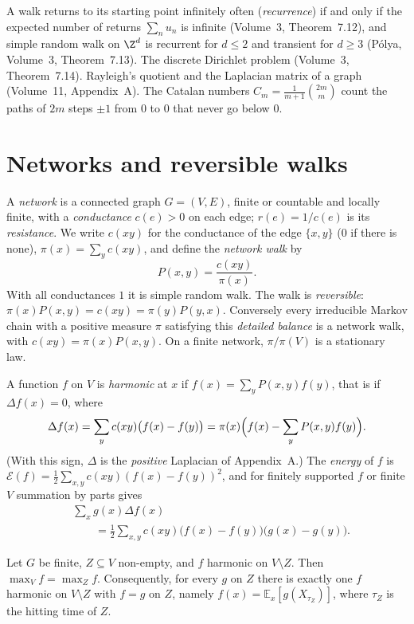 \begin{reminder}
A walk returns to its starting point infinitely often (\emph{recurrence}) if and only if the expected number of returns $\sum_nu_n$ is infinite (Volume~3, Theorem~7.12), and simple random walk on $\Z^d$ is recurrent for
$d\le2$ and transient for $d\ge3$ (P\'olya, Volume~3, Theorem~7.13). The discrete Dirichlet problem (Volume~3, Theorem~7.14). Rayleigh's quotient and the Laplacian matrix of a graph (Volume~11, Appendix~A). The Catalan numbers
$C_m=\frac1{m+1}\binom{2m}m$ count the paths of $2m$ steps $\pm1$ from $0$ to $0$ that never go below $0$.
\end{reminder}

\section{Networks and reversible walks}

A \emph{network} is a connected graph $G=(V,E)$, finite or countable and locally finite, with a \emph{conductance} $c(e)>0$ on each edge; $r(e)=1/c(e)$ is its \emph{resistance}. We write $c(xy)$ for the conductance of the edge
$\{x,y\}$ ($0$ if there is none), $\pi(x)=\sum_yc(xy)$, and define the \emph{network walk} by
\[
P(x,y)=\frac{c(xy)}{\pi(x)} .
\]
With all conductances $1$ it is simple random walk. The walk is \emph{reversible}: $\pi(x)P(x,y)=c(xy)=\pi(y)P(y,x)$. Conversely every irreducible Markov chain with a positive measure $\pi$ satisfying this
\emph{detailed balance} is a network walk, with $c(xy)=\pi(x)P(x,y)$. On a finite network, $\pi/\pi(V)$ is a stationary law.

A function $f$ on $V$ is \emph{harmonic} at $x$ if $f(x)=\sum_yP(x,y)f(y)$, that is if $\Delta f(x)=0$, where
\[
\Delta f(x)=\sum_yc(xy)\bigl(f(x)-f(y)\bigr)=\pi(x)\Bigl(f(x)-\sum_yP(x,y)f(y)\Bigr).
\]
(With this sign, $\Delta$ is the \emph{positive} Laplacian of Appendix~A.) The \emph{energy} of $f$ is $\mathcal E(f)=\frac12\sum_{x,y}c(xy)(f(x)-f(y))^2$, and for finitely supported $f$ or finite $V$ summation by parts gives
\begin{equation}\label{eq:green}
\begin{aligned}
&\sum_xg(x)\Delta f(x)\\
&\qquad=\frac12\sum_{x,y}c(xy)\bigl(f(x)-f(y)\bigr)\bigl(g(x)-g(y)\bigr).
\end{aligned}
\end{equation}

\begin{lemma}\label{lem:maxprinciple}
Let $G$ be finite, $Z\subseteq V$ non-empty, and $f$ harmonic on $V\setminus Z$. Then $\max_Vf=\max_Zf$. Consequently, for every $g$ on $Z$ there is exactly one $f$ harmonic on $V\setminus Z$ with $f=g$ on $Z$, namely
$f(x)=\mathbb E_x[g(X_{\tau_Z})]$, where $\tau_Z$ is the hitting time of $Z$.
\end{lemma}

